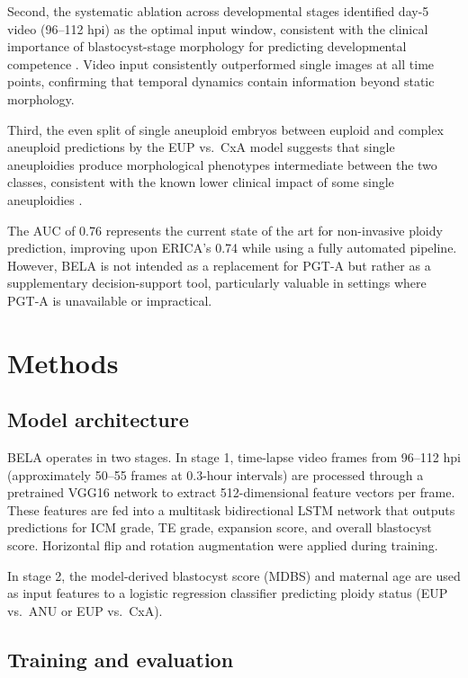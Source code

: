 \documentclass[11pt]{article}
\begin{document}
Second, the systematic ablation across developmental stages identified day-5 video (96--112 hpi) as the optimal input window, consistent with the clinical importance of blastocyst-stage morphology for predicting developmental competence \citep{gardner2015, meseguer2011}. Video input consistently outperformed single images at all time points, confirming that temporal dynamics contain information beyond static morphology.

Third, the even split of single aneuploid embryos between euploid and complex aneuploid predictions by the EUP vs.\ CxA model suggests that single aneuploidies produce morphological phenotypes intermediate between the two classes, consistent with the known lower clinical impact of some single aneuploidies \citep{fragouli2017}.

The AUC of 0.76 represents the current state of the art for non-invasive ploidy prediction, improving upon ERICA's 0.74 \citep{barnes2023} while using a fully automated pipeline. However, BELA is not intended as a replacement for PGT-A but rather as a supplementary decision-support tool, particularly valuable in settings where PGT-A is unavailable or impractical.

\section{Methods}

\subsection{Model architecture}

BELA operates in two stages. In stage 1, time-lapse video frames from 96--112 hpi (approximately 50--55 frames at 0.3-hour intervals) are processed through a pretrained VGG16 network \citep{simonyan2015} to extract 512-dimensional feature vectors per frame. These features are fed into a multitask bidirectional LSTM network \citep{hochreiter1997} that outputs predictions for ICM grade, TE grade, expansion score, and overall blastocyst score. Horizontal flip and rotation augmentation were applied during training.

In stage 2, the model-derived blastocyst score (MDBS) and maternal age are used as input features to a logistic regression classifier predicting ploidy status (EUP vs.\ ANU or EUP vs.\ CxA).

\subsection{Training and evaluation}
\end{document}
